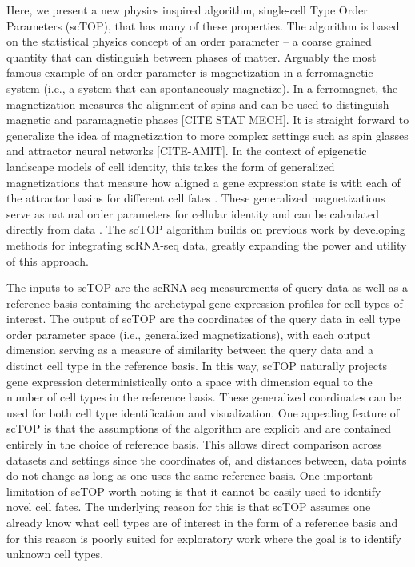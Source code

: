 \documentclass[aps,superscriptaddress, notitlepage,longbibliography]{revtex4-1}
\begin{document}
Here, we present a new physics inspired algorithm, single-cell Type Order Parameters (scTOP), that has many of these properties. The algorithm is based on the statistical physics concept of an order parameter -- a coarse grained quantity that can distinguish between phases of matter. Arguably the most famous example of an order parameter is  magnetization in a ferromagnetic system (i.e., a system that can spontaneously magnetize). In a ferromagnet, the magnetization measures the alignment of spins and can be used to distinguish magnetic and paramagnetic phases [CITE STAT MECH]. It is straight forward to generalize the idea of magnetization to more complex settings such as spin glasses and attractor neural networks [CITE-AMIT]. In the context of epigenetic landscape models of cell identity, this takes the form of generalized magnetizations that measure how aligned a gene expression state is with each of the attractor basins for different cell fates \cite{lang_epigenetic_2014,pusuluri_cellular_2017}. These generalized magnetizations serve as natural order parameters for cellular identity and can be calculated directly from data \cite{lang_epigenetic_2014,pusuluri_cellular_2017, dame_thyroid_2017,ikonomou_vivo_2020}. The scTOP algorithm builds on previous work by developing methods for integrating scRNA-seq data, greatly expanding the power and utility of this approach. 
 
The inputs to scTOP are the scRNA-seq measurements of query data as well as a reference basis containing the archetypal gene expression profiles for cell types of interest. The output of scTOP are the coordinates  of the query data  in cell type order parameter space (i.e., generalized magnetizations), with each output dimension serving as a measure of similarity between the query data and a distinct cell type in the reference basis. In this way, scTOP naturally projects gene expression deterministically onto a space with dimension equal to the number of cell types in the reference basis. These generalized coordinates can be used for both cell type identification and visualization. One appealing feature of scTOP is that the assumptions of the algorithm are explicit and are contained entirely in the choice of reference basis. This allows direct comparison across datasets and settings since  the coordinates of, and distances between, data points do not change as long as one uses the same reference basis. One important limitation of scTOP worth noting  is that it cannot be easily used to identify novel cell fates. The underlying reason for this is that scTOP assumes one already know what cell types are of interest in the form of a reference basis and for this reason is poorly suited for exploratory work where the goal is to identify unknown cell types. 
\end{document}
